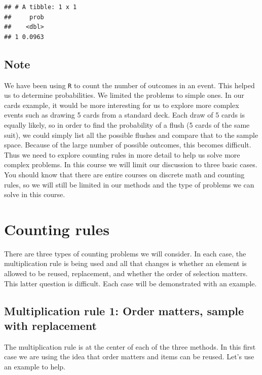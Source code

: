 \documentclass[
]{book}
\begin{document}
\begin{verbatim}
## # A tibble: 1 x 1
##     prob
##    <dbl>
## 1 0.0963
\end{verbatim}

\hypertarget{note}{%
\subsection{Note}\label{note}}

We have been using \texttt{R} to count the number of outcomes in an event. This helped us to determine probabilities. We limited the problems to simple ones. In our cards example, it would be more interesting for us to explore more complex events such as drawing 5 cards from a standard deck. Each draw of 5 cards is equally likely, so in order to find the probability of a flush (5 cards of the same suit), we could simply list all the possible flushes and compare that to the sample space. Because of the large number of possible outcomes, this becomes difficult. Thus we need to explore counting rules in more detail to help us solve more complex problems. In this course we will limit our discussion to three basic cases. You should know that there are entire courses on discrete math and counting rules, so we will still be limited in our methods and the type of problems we can solve in this course.

\hypertarget{counting-rules}{%
\section{Counting rules}\label{counting-rules}}

There are three types of counting problems we will consider. In each case, the multiplication rule is being used and all that changes is whether an element is allowed to be reused, replacement, and whether the order of selection matters. This latter question is difficult. Each case will be demonstrated with an example.

\hypertarget{multiplication-rule-1-order-matters-sample-with-replacement}{%
\subsection{Multiplication rule 1: Order matters, sample with replacement}\label{multiplication-rule-1-order-matters-sample-with-replacement}}

The multiplication rule is at the center of each of the three methods. In this first case we are using the idea that order matters and items can be reused. Let's use an example to help.
\end{document}
